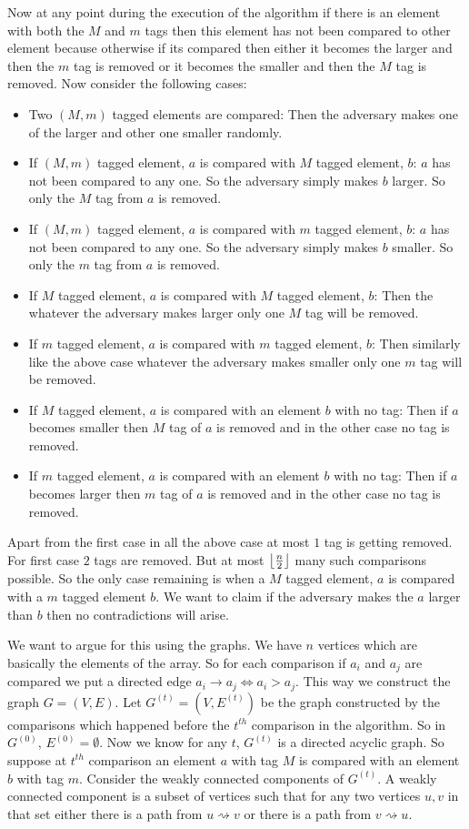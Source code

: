 \documentclass[a4paper, 11pt]{article}
\begin{document}
{Now at any point during the execution of the algorithm if there is an element with both the $M$ and $m$ tags then this element has not been compared to other element because otherwise if its compared then either it becomes the larger and then the $m$ tag is removed or it becomes the smaller and then the $M$ tag is removed. Now consider the following cases:
\begin{itemize}
	\item Two $(M,m)$ tagged elements are compared: Then the adversary makes one of the larger and other one smaller randomly.
	\item If $(M,m)$ tagged element, $a$ is compared with $M$ tagged element, $b$: $a$ has not been compared to any one. So the adversary simply makes $b$ larger. So only the $M$ tag from $a$ is removed.
	\item If $(M,m)$ tagged element, $a$ is compared with $m$ tagged element, $b$: $a$ has not been compared to any one. So the adversary simply makes $b$ smaller. So only the $m$ tag from $a$ is removed.
	\item If $M$ tagged element, $a$ is compared with $M$ tagged element, $b$: Then the whatever the adversary makes larger only one $M$ tag will be removed. 
	\item If $m$ tagged element, $a$ is compared with $m$ tagged element, $b$: Then similarly like the above case whatever the adversary makes smaller only one $m$ tag will be removed. 
	\item If $M$ tagged element, $a$ is compared with an element $b$ with no tag: Then if $a$ becomes smaller then $M$ tag of $a$ is removed and in the other case no tag is removed.
	\item If $m$ tagged element, $a$ is compared with an element $b$ with no tag: Then if $a$ becomes larger then $m$ tag of $a$ is removed and in the other case no tag is removed.
\end{itemize}
Apart from the first case in all the above case at most $1$ tag is getting removed. For first case $2$ tags are removed. But at most $\left\lfloor\frac{n}{2}\right\rfloor$ many such comparisons possible. So the only case remaining is when a $M$ tagged element, $a$ is compared with a $m$ tagged element $b$. We want to claim if the adversary makes the $a$ larger than $b$ then no contradictions will arise.

We want to argue for this using the graphs. We have $n$ vertices which are basically the elements of the array. So for each comparison if $a_i$ and $a_j$ are compared we put a directed edge $a_i\to a_j \iff a_i>a_j$. This way we construct the graph $G=(V,E)$. Let ${G^{(t)}=(V,E^{(t)})}$ be the graph constructed by the comparisons which happened before the $t^{th}$ comparison in the algorithm. So in $G^{(0)}$, $E^{(0)}=\emptyset$. Now we know for any $t$, $G^{(t)}$ is a directed acyclic graph. So suppose at $t^{th}$ comparison an element $a$ with tag $M$ is compared with an element $b$ with tag $m$. Consider the weakly connected components of $G^{(t)}$. A weakly connected component is a subset of vertices such that for any two vertices $u,v$ in that set either there is a path from $u\rightsquigarrow v$ or there is a path from $v\rightsquigarrow u$. 

}
\end{document}
